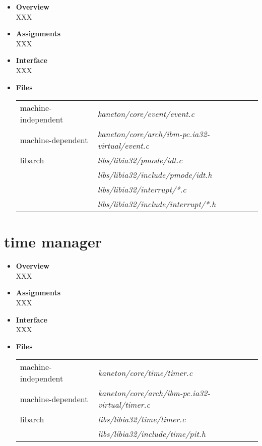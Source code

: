 \begin{itemize}
  \item {\bf Overview}\\
    XXX
  \item {\bf Assignments}\\
    XXX
  \item {\bf Interface}\\
    XXX
  \item {\bf {Files}}\\

    \begin{tabular}{| l | l |}
      \hline
      machine-independent & {\em kaneton/core/event/event.c}\\
      machine-dependent & {\em kaneton/core/arch/ibm-pc.ia32-virtual/event.c}\\
      libarch & {\em libs/libia32/pmode/idt.c}\\
      & {\em libs/libia32/include/pmode/idt.h}\\
      & {\em libs/libia32/interrupt/*.c}\\
      & {\em libs/libia32/include/interrupt/*.h}\\\hline
    \end{tabular}
\end{itemize}


%
%

\newpage

\section{\textbf{time} manager}
\begin{itemize}
  \item {\bf Overview}\\
    XXX
  \item {\bf Assignments}\\
    XXX
  \item {\bf Interface}\\
    XXX
  \item {\bf Files}\\

    \begin{tabular}{| l | l |}
      \hline
      machine-independent & {\em kaneton/core/time/timer.c}\\
      machine-dependent & {\em kaneton/core/arch/ibm-pc.ia32-virtual/timer.c}\\
      libarch & {\em libs/libia32/time/timer.c}\\
      &  {\em libs/libia32/include/time/pit.h}\\\hline
    \end{tabular}

\end{itemize}

